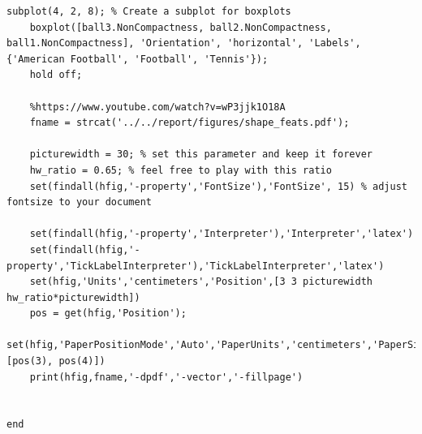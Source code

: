 \documentclass[conference]{IEEEtran}
\begin{document}
\begin{lstlisting}[style=Matlab-editor, basicstyle=\scriptsize]
    subplot(4, 2, 8); % Create a subplot for boxplots
    boxplot([ball3.NonCompactness, ball2.NonCompactness, ball1.NonCompactness], 'Orientation', 'horizontal', 'Labels', {'American Football', 'Football', 'Tennis'});
    hold off;

    %https://www.youtube.com/watch?v=wP3jjk1O18A
    fname = strcat('../../report/figures/shape_feats.pdf');

    picturewidth = 30; % set this parameter and keep it forever
    hw_ratio = 0.65; % feel free to play with this ratio
    set(findall(hfig,'-property','FontSize'),'FontSize', 15) % adjust fontsize to your document

    set(findall(hfig,'-property','Interpreter'),'Interpreter','latex') 
    set(findall(hfig,'-property','TickLabelInterpreter'),'TickLabelInterpreter','latex')
    set(hfig,'Units','centimeters','Position',[3 3 picturewidth hw_ratio*picturewidth])
    pos = get(hfig,'Position');
    set(hfig,'PaperPositionMode','Auto','PaperUnits','centimeters','PaperSize',[pos(3), pos(4)])
    print(hfig,fname,'-dpdf','-vector','-fillpage')

    
end
            \end{lstlisting}
\end{document}
